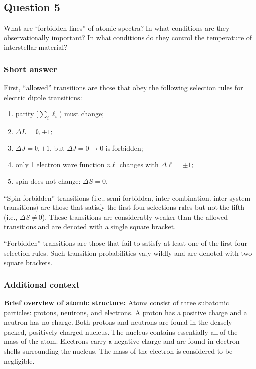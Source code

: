 \documentclass[a4paper,10pt]{article}
\begin{document}

\newpage
\subsection{Question 5}

What are ``forbidden lines'' of atomic spectra? In what conditions are they observationally important? In what conditions do they control the temperature of interstellar material?

\subsubsection{Short answer}

First, ``allowed'' transitions are those that obey the following selection rules for electric dipole transitions:

\begin{enumerate}
    \item parity ($\sum_i\ell_i$) must change;
    \item $\Delta L=0,\pm1$;
    \item $\Delta J=0,\pm1$, but $\Delta J=0\rightarrow0$ is forbidden;
    \item only 1 electron wave function $n\ell$ changes with $\Delta\ell=\pm1$;
    \item spin does not change: $\Delta S=0$.
\end{enumerate}

{\noindent}``Spin-forbidden'' transitions (i.e., semi-forbidden, inter-combination, inter-system transitions) are those that satisfy the first four selections rules but not the fifth (i.e., $\Delta S\neq0$). These transitions are considerably weaker than the allowed transitions and are denoted with a single square bracket.

{\noindent}``Forbidden'' transitions are those that fail to satisfy at least one of the first four selection rules. Such transition probabilities vary wildly and are denoted with two square brackets.

\subsubsection{Additional context}

{\noindent}\textbf{Brief overview of atomic structure:} Atoms consist of three subatomic particles: protons, neutrons, and electrons. A proton has a positive charge and a neutron has no charge. Both protons and neutrons are found in the densely packed, positively charged nucleus. The nucleus contains essentially all of the mass of the atom. Electrons carry a negative charge and are found in electron shells surrounding the nucleus. The mass of the electron is considered to be negligible.
\end{document}
